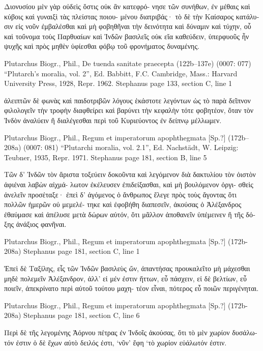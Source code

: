 \documentclass[12pt,letterpaper,twoside,final]{memoir}
\begin{document}
\begin{greek}
                             Διονυσίου μὲν γὰρ οὐδεὶς ὅστις οὐκ ἂν κατεφρό-
νησε τῶν συνήθων, ἐν μέθαις καὶ κύβοις καὶ γυναιξὶ τὰς πλείστας ποιου-
μένου διατριβάς· τὸ δὲ τὴν Καίσαρος κατάλυσιν εἰς νοῦν ἐμβαλέσθαι καὶ 
μὴ φοβηθῆναι τὴν δεινότητα καὶ δύναμιν καὶ τύχην, οὗ καὶ τοὔνομα τοὺς 
Παρθυαίων καὶ Ἰνδῶν βασιλεῖς οὐκ εἴα καθεύδειν, ὑπερφυοῦς ἦν ψυχῆς 
καὶ πρὸς μηθὲν ὑφίεσθαι φόβῳ τοῦ φρονήματος δυναμένης. 



Plutarchus Biogr., Phil., De tuenda sanitate praecepta (122b–137e) (0007: 077)
“Plutarch's moralia, vol. 2”, Ed. Babbitt, F.C.
Cambridge, Mass.: Harvard University Press, 1928, Repr. 1962.
Stephanus page 133, section C, line 1

                         ἀλειπτῶν δὲ φωνὰς καὶ 
παιδοτριβῶν λόγους ἑκάστοτε λεγόντων ὡς τὸ 
παρὰ δεῖπνον φιλολογεῖν τὴν τροφὴν διαφθείρει 
καὶ βαρύνει τὴν κεφαλὴν τότε φοβητέον, ὅταν 
τὸν Ἰνδὸν ἀναλύειν ἢ διαλέγεσθαι περὶ τοῦ 
Κυριεύοντος ἐν δείπνῳ μέλλωμεν. 



Plutarchus Biogr., Phil., Regum et imperatorum apophthegmata [Sp.?] (172b–208a) (0007: 081)
“Plutarchi moralia, vol. 2.1”, Ed. Nachstädt, W.
Leipzig: Teubner, 1935, Repr. 1971.
Stephanus page 181, section B, line 5

Τῶν δ' Ἰνδῶν τὸν ἄριστα τοξεύειν δοκοῦντα καὶ 
λεγόμενον διὰ δακτυλίου τὸν ὀιστὸν ἀφιέναι λαβὼν αἰχμά-
λωτον ἐκέλευσεν ἐπιδείξασθαι, καὶ μὴ βουλόμενον ὀργι-
σθεὶς ἀνελεῖν προσέταξε· ἐπεὶ δ' ἀγόμενος ὁ ἄνθρωπος 
ἔλεγε πρὸς τοὺς ἄγοντας ὅτι πολλῶν ἡμερῶν οὐ μεμελέ-
τηκε καὶ ἐφοβήθη διαπεσεῖν, ἀκούσας ὁ Ἀλέξανδρος 
ἐθαύμασε καὶ ἀπέλυσε μετὰ δώρων αὐτόν, ὅτι μᾶλλον 
ἀποθανεῖν ὑπέμεινεν ἢ τῆς δόξης ἀνάξιος φανῆναι. 



Plutarchus Biogr., Phil., Regum et imperatorum apophthegmata [Sp.?] (172b-208a) 
Stephanus page 181, section C, line 1

Ἐπεὶ δὲ Ταξίλης, εἷς τῶν Ἰνδῶν βασιλεὺς ὤν, 
ἀπαντήσας προυκαλεῖτο μὴ μάχεσθαι μηδὲ πολεμεῖν 
Ἀλέξανδρον, ἀλλ' εἰ μέν ἐστιν ἥττων, εὖ πάσχειν, εἰ δὲ 
βελτίων, εὖ ποιεῖν, ἀπεκρίνατο περὶ αὐτοῦ τούτου μαχη-
τέον εἶναι, πότερος εὖ ποιῶν περιγένηται. 



Plutarchus Biogr., Phil., Regum et imperatorum apophthegmata [Sp.?] (172b-208a) 
Stephanus page 181, section C, line 6

Περὶ δὲ τῆς λεγομένης Ἀόρνου πέτρας ἐν Ἰνδοῖς 
ἀκούσας, ὅτι τὸ μὲν χωρίον δυσάλωτόν ἐστιν ὁ δὲ ἔχων 
αὐτὸ δειλός ἐστι, ‘νῦν’ ἔφη ‘τὸ χωρίον εὐάλωτόν ἐστιν. 




\end{greek}
\end{document}
